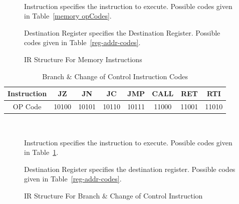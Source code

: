 \documentclass[12pt]{article}
\theoremstyle{plain}
\theoremstyle{definition}
\begin{document}
    \begin{figure}[H]
        \centering
        \caption{IR Structure For Memory Instructions}
        \label{IR-memory}
        \vspace{0.5 cm}
         \\
        \vspace{0.5 cm}
        \begin{regdesc}\begin{reglist}            
            \item [Instruction] specifies the instruction to execute. Possible codes given in Table~\ref{memory opCodes}.
            \item [Destination Register] specifies the Destination Register. Possible codes given in Table~\ref{reg-addr-codes}.
        \end{reglist}\end{regdesc}
    \end{figure}
    \begin{table}[H]
        \centering
        \begin{tabular}{|c|c|c|c|c|c|c|c|}
            \hline
            Instruction & JZ  & JN & JC  & JMP  & CALL  & RET  & RTI \\ \hline
            OP Code     & 10100 & 10101 & 10110 & 10111 & 11000 & 11001 & 11010 \\ \hline
        \end{tabular}
        \caption{Branch $\&$ Change of Control Instruction Codes}
        \label{Branch Opcodes}
    \end{table}
    \begin{figure}[H]
        \centering
        \caption{IR Structure For Branch $\&$ Change of Control Instruction}
        \label{IR-Branch}
        \vspace{0.5 cm}
         \\
        \vspace{0.5 cm}
        \begin{regdesc}\begin{reglist}            
            \item [Instruction] specifies the instruction to execute. Possible codes given in Table~\ref{Branch Opcodes}.
            \item [Destination Register] specifies the destination register. Possible codes given in Table~\ref{reg-addr-codes}.
        \end{reglist}\end{regdesc}
    \end{figure}
\pagebreak
\end{document}
